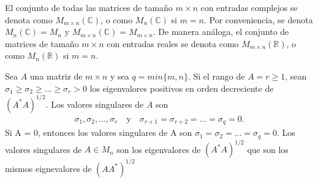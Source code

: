 \begin{definition}
	El conjunto de todas las matrices de tamaño $m \times n$ con entradas complejos se denota como $M_{m \times n} (\mathbb{C})$, o como $M_{n} (\mathbb{C})$ si $m = n$. Por conveniencia, se denota $M_{n} (\mathbb{C}) = M_{n}$ y $M_{m \times n} (\mathbb{C}) = M_{m \times n}$. De manera análoga, el conjunto de matrices de tamaño $m \times n$ con entradas reales se denota como $M_{m \times n} (\mathbb{R})$, o como $M_{n} (\mathbb{R})$ si $m = n$. \cite[p.~24]{garcia2017second}
\end{definition}

\begin{definition}
Sea $A$ una matriz de $m \times n$ y sea $q = min \{m, n \}$. Si el rango de $A = r \geq 1$, sean $\sigma_1 \geq \sigma_2 \geq \dots \geq \sigma_r > 0$ los eigenvalores positivos en orden decreciente de $(A^{*}A)^{1/2}$. Los valores singulares de $A$ son
\begin{equation*}
    \begin{aligned}
    \sigma_1, \sigma_2, \dots, \sigma_r \quad \text{y} \quad \sigma_{r+1} = \sigma_{r+2} = \dots = \sigma_q = 0.
    \end{aligned}
\end{equation*}
Si A = 0, entonces los valores singulares de A son $\sigma_1 = \sigma_2 = \dots = \sigma_q = 0$. 
Los valores singulares de $A \in M_{n}$ son los eigenvalores de $(A^{*}A)^{1/2}$ que son los mismos eignevalores de $(AA^{*})^{1/2}$
\cite[p.~420]{garcia2017second}
\end{definition}


